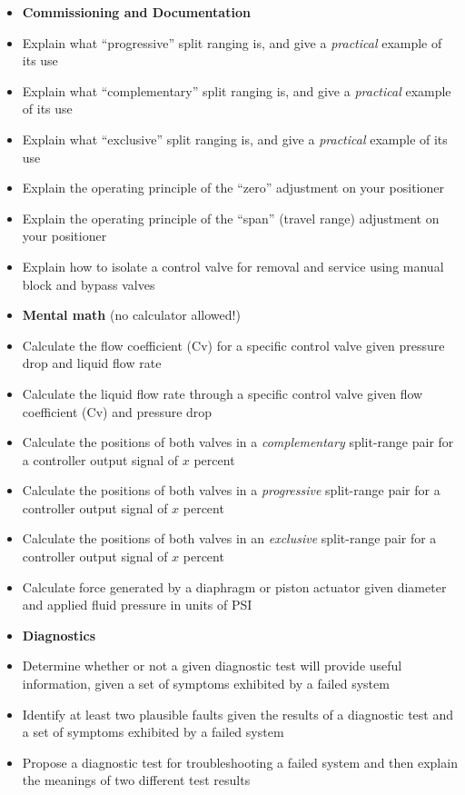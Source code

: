 \filbreak

\begin{itemize}
\item{} {\bf Commissioning and Documentation}
\item{} Explain what ``progressive'' split ranging is, and give a {\it practical} example of its use
\item{} Explain what ``complementary'' split ranging is, and give a {\it practical} example of its use
\item{} Explain what ``exclusive'' split ranging is, and give a {\it practical} example of its use
\item{} Explain the operating principle of the ``zero'' adjustment on your positioner
\item{} Explain the operating principle of the ``span'' (travel range) adjustment on your positioner
\item{} Explain how to isolate a control valve for removal and service using manual block and bypass valves
\end{itemize}

\filbreak

\begin{itemize}
\item{} {\bf Mental math} (no calculator allowed!)
\item{} Calculate the flow coefficient (Cv) for a specific control valve given pressure drop and liquid flow rate
\item{} Calculate the liquid flow rate through a specific control valve given flow coefficient (Cv) and pressure drop
\item{} Calculate the positions of both valves in a {\it complementary} split-range pair for a controller output signal of $x$ percent
\item{} Calculate the positions of both valves in a {\it progressive} split-range pair for a controller output signal of $x$ percent
\item{} Calculate the positions of both valves in an {\it exclusive} split-range pair for a controller output signal of $x$ percent
\item{} Calculate force generated by a diaphragm or piston actuator given diameter and applied fluid pressure in units of PSI
\end{itemize}

\filbreak

\begin{itemize}
\item{} {\bf Diagnostics}
\item{} Determine whether or not a given diagnostic test will provide useful information, given a set of symptoms exhibited by a failed system
\item{} Identify at least two plausible faults given the results of a diagnostic test and a set of symptoms exhibited by a failed system
\item{} Propose a diagnostic test for troubleshooting a failed system and then explain the meanings of two different test results
\end{itemize}



